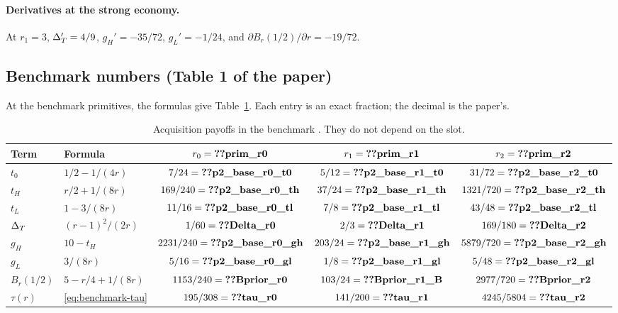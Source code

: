 \paragraph{Derivatives at the strong economy.} At \(r_1=3\), \(\Delta_T'=4/9\), \(g_H'=-35/72\), \(g_L'=-1/24\),
and \(\partial B_r(1/2)/\partial r=-19/72\).

\subsection{Benchmark numbers (Table 1 of the paper)}\label{sec:03_auction-table}

At the benchmark primitives, the formulas give Table~\ref{tab:03_auction-table1}.
Each entry is an exact fraction; the decimal is the paper's.

\begin{table}[!htbp]
\centering\small
\setlength{\tabcolsep}{4pt}
\begin{tabular}{@{}llccc@{}}
\toprule
Term & Formula & \(r_0=\reg{prim_r0}\) & \(r_1=\reg{prim_r1}\) & \(r_2=\reg{prim_r2}\)\\
\midrule
\(t_0\) & \(1/2-1/(4r)\) & \(7/24=\reg{p2_base_r0_t0}\) & \(5/12=\reg{p2_base_r1_t0}\) & \(31/72=\reg{p2_base_r2_t0}\)\\
\(t_H\) & \(r/2+1/(8r)\) & \(169/240=\reg{p2_base_r0_th}\) & \(37/24=\reg{p2_base_r1_th}\) & \(1321/720=\reg{p2_base_r2_th}\)\\
\(t_L\) & \(1-3/(8r)\) & \(11/16=\reg{p2_base_r0_tl}\) & \(7/8=\reg{p2_base_r1_tl}\) & \(43/48=\reg{p2_base_r2_tl}\)\\
\(\Delta_T\) & \((r-1)^2/(2r)\) & \(1/60=\reg{Delta_r0}\) & \(2/3=\reg{Delta_r1}\) & \(169/180=\reg{Delta_r2}\)\\
\(g_H\) & \(10-t_H\) & \(2231/240=\reg{p2_base_r0_gh}\) & \(203/24=\reg{p2_base_r1_gh}\) & \(5879/720=\reg{p2_base_r2_gh}\)\\
\(g_L\) & \(3/(8r)\) & \(5/16=\reg{p2_base_r0_gl}\) & \(1/8=\reg{p2_base_r1_gl}\) & \(5/48=\reg{p2_base_r2_gl}\)\\
\(B_r(1/2)\) & \(5-r/4+1/(8r)\) & \(1153/240=\reg{Bprior_r0}\) & \(103/24=\reg{Bprior_r1_B}\) & \(2977/720=\reg{Bprior_r2}\)\\
\(\tau(r)\) & \eqref{eq:benchmark-tau} & \(195/308=\reg{tau_r0}\) & \(141/200=\reg{tau_r1}\) & \(4245/5804=\reg{tau_r2}\)\\
\bottomrule
\end{tabular}
\caption{Acquisition payoffs in the benchmark . They do not depend on the slot.}
\label{tab:03_auction-table1}
\end{table}

